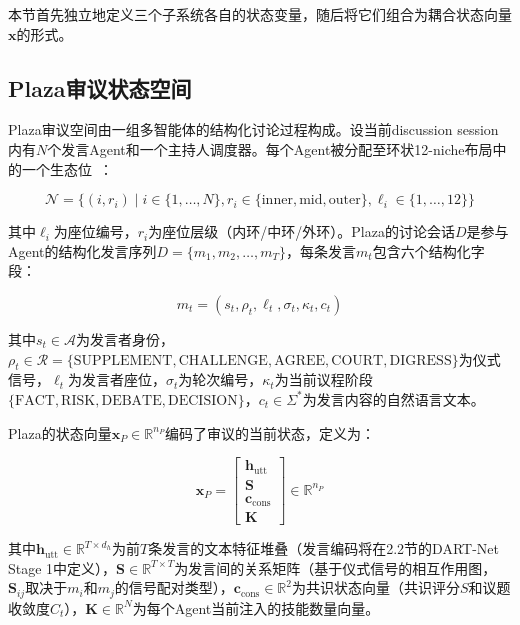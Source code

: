 \documentclass[twocolumn,10.5pt]{ctexart}
\def\bmat#1{\begin{bmatrix}#1\end{bmatrix}}
\def\R{\mathbb{R}}
\begin{document}
本节首先独立地定义三个子系统各自的状态变量，随后将它们组合为耦合状态向量$\mathbf{x}$的形式。

\subsection{Plaza审议状态空间}

Plaza审议空间由一组多智能体的结构化讨论过程构成。设当前discussion session 内有$N$个发言Agent和一个主持人调度器。每个Agent被分配至环状12-niche布局中的一个生态位~\cite{kaner2014facilitator}：

\begin{equation}
\mathcal{N} = \{(i, r_i) \mid i \in \{1,\ldots,N\}, r_i \in \{\mathrm{inner, mid, outer}\}, \ell_i \in \{1,\ldots,12\}\}
\label{eq:niche}
\end{equation}

其中$\ell_i$为座位编号，$r_i$为座位层级（内环/中环/外环）。Plaza的讨论会话$D$是参与Agent的结构化发言序列$D = \{m_1, m_2, \ldots, m_T\}$，每条发言$m_t$包含六个结构化字段：

\begin{equation}
m_t = (s_t, \rho_t, \ell_t, \sigma_t, \kappa_t, c_t)
\label{eq:message}
\end{equation}

其中$s_t \in \mathcal{A}$为发言者身份，$\rho_t \in \mathcal{R} = \{\mathrm{SUPPLEMENT}, \mathrm{CHALLENGE}, \mathrm{AGREE}, \mathrm{COURT}, \mathrm{DIGRESS}\}$为仪式信号，$\ell_t$为发言者座位，$\sigma_t$为轮次编号，$\kappa_t$为当前议程阶段$\{\mathrm{FACT}, \mathrm{RISK}, \mathrm{DEBATE}, \mathrm{DECISION}\}$，$c_t \in \Sigma^*$为发言内容的自然语言文本。

Plaza的状态向量$\mathbf{x}_P \in \R^{n_P}$编码了审议的当前状态，定义为：

\begin{equation}
\mathbf{x}_P = \bmat{
\mathbf{h}_{\text{utt}} \\
\mathbf{S} \\
\mathbf{c}_{\text{cons}} \\
\mathbf{K}
} \in \R^{n_P}
\label{eq:xp}
\end{equation}

其中$\mathbf{h}_{\text{utt}} \in \R^{T \times d_h}$为前$T$条发言的文本特征堆叠（发言编码将在2.2节的DART-Net Stage 1中定义），$\mathbf{S} \in \R^{T \times T}$为发言间的关系矩阵（基于仪式信号的相互作用图，$\mathbf{S}_{ij}$取决于$m_i$和$m_j$的信号配对类型），$\mathbf{c}_{\text{cons}} \in \R^2$为共识状态向量（共识评分$S$和议题收敛度$C_t$），$\mathbf{K} \in \R^{N}$为每个Agent当前注入的技能数量向量。
\end{document}
